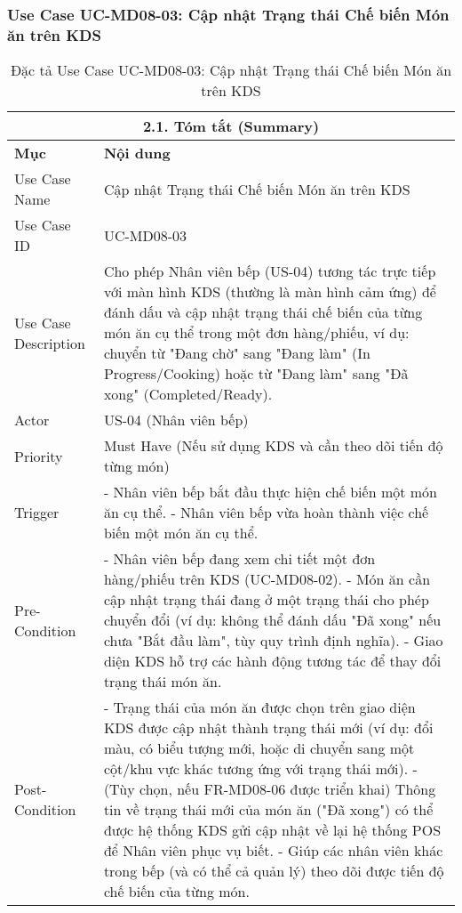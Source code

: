 \subsubsection{Use Case UC-MD08-03: Cập nhật Trạng thái Chế biến Món ăn trên KDS}
\begin{longtable}{|m{4cm}|p{11cm}|}
\caption{Đặc tả Use Case UC-MD08-03: Cập nhật Trạng thái Chế biến Món ăn trên KDS} \label{tab:uc_md08_03_final_v2} \\
\hline
\multicolumn{2}{|c|}{\textbf{2.1. Tóm tắt (Summary)}} \\
\hline
\textbf{Mục} & \textbf{Nội dung} \\
\hline
\endhead %
\hline
\endfoot %
\hline
\endlastfoot %
Use Case Name & Cập nhật Trạng thái Chế biến Món ăn trên KDS \\
\hline
Use Case ID & UC-MD08-03 \\
\hline
Use Case Description & Cho phép Nhân viên bếp (US-04) tương tác trực tiếp với màn hình KDS (thường là màn hình cảm ứng) để đánh dấu và cập nhật trạng thái chế biến của từng món ăn cụ thể trong một đơn hàng/phiếu, ví dụ: chuyển từ "Đang chờ" sang "Đang làm" (In Progress/Cooking) hoặc từ "Đang làm" sang "Đã xong" (Completed/Ready). \\
\hline
Actor & US-04 (Nhân viên bếp) \\
\hline
Priority & Must Have (Nếu sử dụng KDS và cần theo dõi tiến độ từng món) \\
\hline
Trigger & - Nhân viên bếp bắt đầu thực hiện chế biến một món ăn cụ thể. \newline - Nhân viên bếp vừa hoàn thành việc chế biến một món ăn cụ thể. \\
\hline
Pre-Condition & - Nhân viên bếp đang xem chi tiết một đơn hàng/phiếu trên KDS (UC-MD08-02). \newline - Món ăn cần cập nhật trạng thái đang ở một trạng thái cho phép chuyển đổi (ví dụ: không thể đánh dấu "Đã xong" nếu chưa "Bắt đầu làm", tùy quy trình định nghĩa). \newline - Giao diện KDS hỗ trợ các hành động tương tác để thay đổi trạng thái món ăn. \\
\hline
Post-Condition & - Trạng thái của món ăn được chọn trên giao diện KDS được cập nhật thành trạng thái mới (ví dụ: đổi màu, có biểu tượng mới, hoặc di chuyển sang một cột/khu vực khác tương ứng với trạng thái mới). \newline - (Tùy chọn, nếu FR-MD08-06 được triển khai) Thông tin về trạng thái mới của món ăn ("Đã xong") có thể được hệ thống KDS gửi cập nhật về lại hệ thống POS để Nhân viên phục vụ biết. \newline - Giúp các nhân viên khác trong bếp (và có thể cả quản lý) theo dõi được tiến độ chế biến của từng món. \\

\end{longtable}
